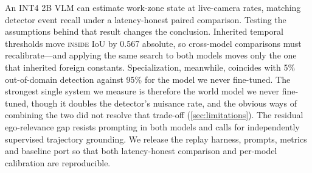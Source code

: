 \documentclass[10pt,twocolumn,letterpaper]{article}
\begin{document}
An INT4 2B VLM can estimate work-zone state at live-camera rates, matching detector event recall under a latency-honest paired comparison.  Testing the assumptions behind that result changes the conclusion.  Inherited temporal thresholds move \textsc{inside} IoU by 0.567 absolute, so cross-model comparisons must recalibrate---and applying the same search to both models moves only the one that inherited foreign constants.  Specialization, meanwhile, coincides with 5\% out-of-domain detection against 95\% for the model we never fine-tuned.  The strongest single system we measure is therefore the world model we never fine-tuned, though it doubles the detector's nuisance rate, and the obvious ways of combining the two did not resolve that trade-off (\cref{sec:limitations}).  The residual ego-relevance gap resists prompting in both models and calls for independently supervised trajectory grounding.  We release the replay harness, prompts, metrics and baseline port so that both latency-honest comparison and per-model calibration are reproducible.

{\small
{}

}
\end{document}
